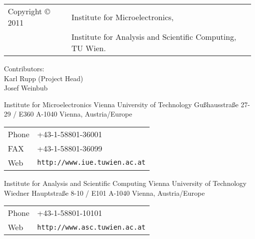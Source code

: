 
\clearpage

\begin{tabular}{ll}
Copyright {\copyright} 2011 & Institute for Microelectronics, \\
                            & Institute for Analysis and Scientific Computing, TU Wien.
\end{tabular}

\vspace{6cm}

Contributors:\\ 

Karl Rupp (Project Head)\\
Josef Weinbub \\




\vspace{5.0cm}

Institute for Microelectronics\newline
Vienna University of Technology\newline
Gu\ss hausstra\ss e 27-29 / E360\newline
A-1040 Vienna, Austria/Europe\newline

\begin{tabular}{ll}
Phone  & +43-1-58801-36001\\
FAX    & +43-1-58801-36099\\
Web    & \texttt{http://www.iue.tuwien.ac.at}
\end{tabular}

\vspace{1.5cm}

Institute for Analysis and Scientific Computing\newline
Vienna University of Technology\newline
Wiedner Hauptstra\ss e 8-10 / E101\newline
A-1040 Vienna, Austria/Europe\newline

\begin{tabular}{ll}
Phone  & +43-1-58801-10101\\
Web    & \texttt{http://www.asc.tuwien.ac.at}
\end{tabular}




